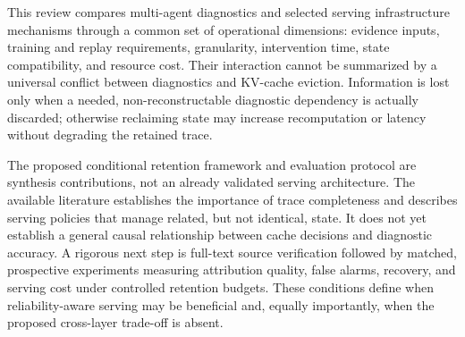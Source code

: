 This review compares multi-agent diagnostics and selected serving infrastructure mechanisms through a common set of operational dimensions: evidence inputs, training and replay requirements, granularity, intervention time, state compatibility, and resource cost. Their interaction cannot be summarized by a universal conflict between diagnostics and KV-cache eviction. Information is lost only when a needed, non-reconstructable diagnostic dependency is actually discarded; otherwise reclaiming state may increase recomputation or latency without degrading the retained trace.

The proposed conditional retention framework and evaluation protocol are synthesis contributions, not an already validated serving architecture. The available literature establishes the importance of trace completeness and describes serving policies that manage related, but not identical, state. It does not yet establish a general causal relationship between cache decisions and diagnostic accuracy. A rigorous next step is full-text source verification followed by matched, prospective experiments measuring attribution quality, false alarms, recovery, and serving cost under controlled retention budgets. These conditions define when reliability-aware serving may be beneficial and, equally importantly, when the proposed cross-layer trade-off is absent.
